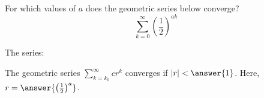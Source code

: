 \documentclass{ximera}
\author{Jim Talamo}
\begin{document}
\begin{exercise}
For which values of $a$ does the geometric series below converge? 
\[
\sum_{k=0}^{\infty} \left(\frac{1}{2}\right)^{ak}
\]

The series:

\begin{multipleChoice}
\end{multipleChoice}

\begin{hint}
The geometric series $\sum_{k=k_0}^{\infty} cr^k$ converges if $|r| < \answer{1}$.  Here, $r = \answer{\left(\frac{1}{2}\right)^a}$.
\end{hint}

\end{exercise}
\end{document}
